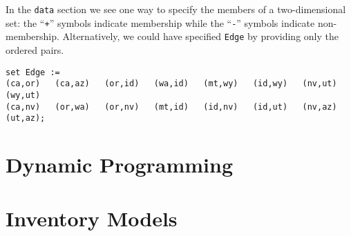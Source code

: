 In the \texttt{data} section we see one way to specify the members of a 
two-dimensional set: the ``\texttt{+}'' symbols indicate membership while the
``\texttt{-}'' symbols indicate non-membership. Alternatively, we could have
specified \texttt{Edge} by providing only the ordered pairs.
\begin{Verbatim}[samepage=true]
set Edge :=
(ca,or)   (ca,az)   (or,id)   (wa,id)   (mt,wy)   (id,wy)   (nv,ut)   (wy,ut)
(ca,nv)   (or,wa)   (or,nv)   (mt,id)   (id,nv)   (id,ut)   (nv,az)   (ut,az);
\end{Verbatim}

\section{Dynamic Programming}

\section{Inventory Models}

\clearpage
